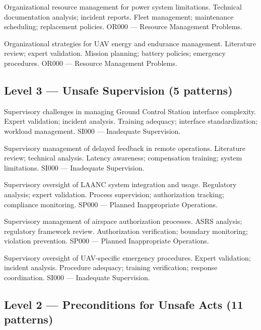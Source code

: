 {Organizational resource management for power system limitations.}
{Technical documentation analysis; incident reports.}
{Fleet management; maintenance scheduling; replacement policies.}
{OR000 --- Resource Management Problems.}

{Organizational strategies for UAV energy and endurance management.}
{Literature review; expert validation.}
{Mission planning; battery policies; emergency procedures.}
{OR000 --- Resource Management Problems.}

\subsection*{Level 3 --- Unsafe Supervision (5 patterns)}

{Supervisory challenges in managing Ground Control Station interface complexity.}
{Expert validation; incident analysis.}
{Training adequacy; interface standardization; workload management.}
{SI000 --- Inadequate Supervision.}

{Supervisory management of delayed feedback in remote operations.}
{Literature review; technical analysis.}
{Latency awareness; compensation training; system limitations.}
{SI000 --- Inadequate Supervision.}

{Supervisory oversight of LAANC system integration and usage.}
{Regulatory analysis; expert validation.}
{Process supervision; authorization tracking; compliance monitoring.}
{SP000 --- Planned Inappropriate Operations.}

{Supervisory management of airspace authorization processes.}
{ASRS analysis; regulatory framework review.}
{Authorization verification; boundary monitoring; violation prevention.}
{SP000 --- Planned Inappropriate Operations.}

{Supervisory oversight of UAV-specific emergency procedures.}
{Expert validation; incident analysis.}
{Procedure adequacy; training verification; response coordination.}
{SI000 --- Inadequate Supervision.}

\subsection*{Level 2 --- Preconditions for Unsafe Acts (11 patterns)}

